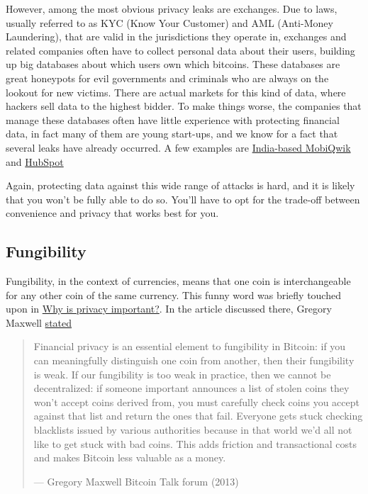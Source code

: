 However, among the most obvious privacy leaks are exchanges. Due to
laws, usually referred to as KYC (Know Your Customer) and AML
(Anti-Money Laundering), that are valid in the jurisdictions they
operate in, exchanges and related companies often have to collect
personal data about their users, building up big databases about which
users own which bitcoins. These databases are great honeypots for evil
governments and criminals who are always on the lookout for new victims.
There are actual markets for this kind of data, where hackers sell data
to the highest bidder. To make things worse, the companies that manage
these databases often have little experience with protecting financial
data, in fact many of them are young start-ups, and we know for a fact
that several leaks have already occurred. A few examples are
\href{https://bitcoinmagazine.com/business/probably-the-largest-kyc-data-leak-in-history-demonstrates-the-importance-of-bitcoin-privacy}{India-based
MobiQwik} and
\href{https://bitcoinmagazine.com/business/hubspot-security-breach-leaks-bitcoin-users-data}{HubSpot}

Again, protecting data against this wide range of attacks is hard, and
it is likely that you won't be fully able to do so. You'll have to opt
for the trade-off between convenience and privacy that works best for
you.

\hypertarget{fungibility}{%
\subsection{Fungibility}\label{fungibility}}

Fungibility, in the context of currencies, means that one coin is
interchangeable for any other coin of the same currency. This funny word
was briefly touched upon in \protect\hyperlink{whyprivacyimportant}{Why
is privacy important?}. In the article discussed there, Gregory Maxwell
\href{https://bitcointalk.org/index.php?topic=334316.msg3588908\#msg3588908}{stated}

\begin{quote}
Financial privacy is an essential element to fungibility in Bitcoin: if
you can meaningfully distinguish one coin from another, then their
fungibility is weak. If our fungibility is too weak in practice, then we
cannot be decentralized: if someone important announces a list of stolen
coins they won't accept coins derived from, you must carefully check
coins you accept against that list and return the ones that fail.
Everyone gets stuck checking blacklists issued by various authorities
because in that world we'd all not like to get stuck with bad coins.
This adds friction and transactional costs and makes Bitcoin less
valuable as a money.

---  Gregory Maxwell Bitcoin Talk forum (2013)
\end{quote}

